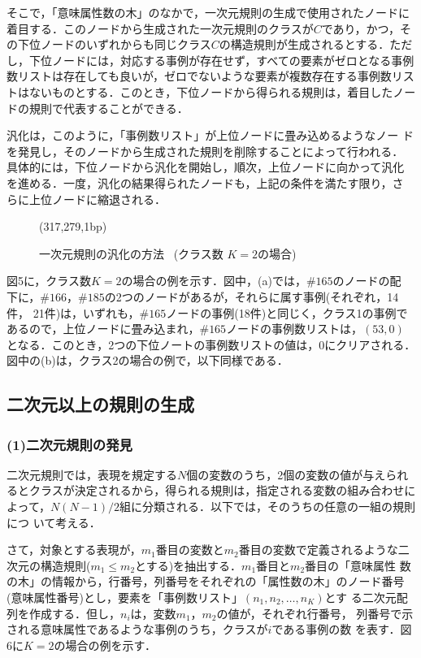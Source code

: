そこで，「意味属性数の木」のなかで，一次元規則の生成で使用されたノードに
着目する．このノードから生成された一次元規則のクラスが$C$であり，かつ，そ
の下位ノードのいずれからも同じクラス$C$の構造規則が生成されるとする．ただ
し，下位ノードには，対応する事例が存在せず，すべての要素がゼロとなる事例
数リストは存在しても良いが，ゼロでないような要素が複数存在する事例数リス
トはないものとする．このとき，下位ノードから得られる規則は，着目したノー
ドの規則で代表することができる．

汎化は，このように，「事例数リスト」が上位ノードに畳み込めるようなノー
ドを発見し，そのノードから生成された規則を削除することによって行われる．
具体的には，下位ノードから汎化を開始し，順次，上位ノードに向かって汎化
を進める．一度，汎化の結果得られたノードも，上記の条件を満たす限り，さ
らに上位ノードに縮退される．
\begin{figure}[thb]
\begin{center}
\begin{epsf}
\end{epsf}
\begin{draft}
\atari(317,279,1bp)
\end{draft}
\end{center}
\vspace*{-4mm}
\caption{一次元規則の汎化の方法 \ (クラス数 $K=2$の場合)}
\label{fig:一次元規則の汎化の方法}
\end{figure}

図5に，クラス数$K=2$の場合の例を示す．図中，(a)では，$\#165$のノードの配
下に，$\#166$，$\#185$の2つのノードがあるが，それらに属す事例(それぞれ，14件，
21件)は，いずれも，$\#165$ノードの事例(18件)と同じく，クラス1の事例で
あるので，上位ノードに畳み込まれ，$\#165$ノードの事例数リストは，$(53, 0)$
となる．このとき，2つの下位ノートの事例数リストの値は，0にクリアされる．
図中の(b)は，クラス2の場合の例で，以下同様である．
\subsection{二次元以上の規則の生成}
\subsubsection*{(1)二次元規則の発見}
二次元規則では，表現を規定する$N$個の変数のうち，2個の変数の値が与えられ
るとクラスが決定されるから，得られる規則は，指定される変数の組み合わせに
よって，${N(N-1)/2}$組に分類される．以下では，そのうちの任意の一組の規則につ
いて考える．

さて，対象とする表現が，${m_1}$番目の変数と${m_2}$番目の変数で定義されるような二
次元の構造規則(${m_1\leq m_2}$とする)を抽出する．${m_1}$番目と${m_2}$番目の「意味属性
数の木」の情報から，行番号，列番号をそれぞれの「属性数の木」のノード番号
(意味属性番号)とし，要素を「事例数リスト」$({n_1,n_2,\dots,n_K})$とす
る二次元配列を作成する．但し，${n_i}$は，変数${m_1}$，${m_2}$の値が，それぞれ行番号，
列番号で示される意味属性であるような事例のうち，クラスが$i$である事例の数
を表す．図6に$K=2$の場合の例を示す．


